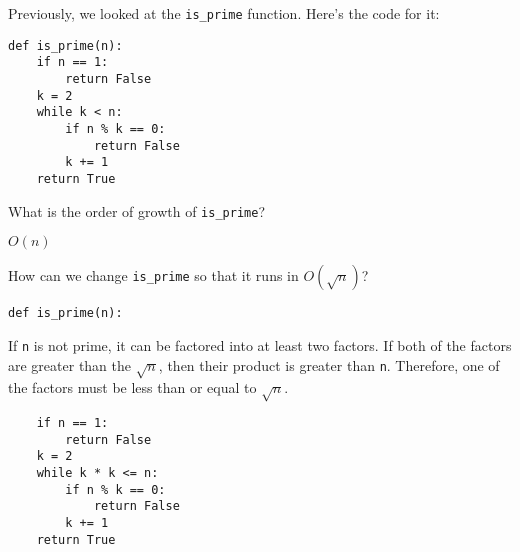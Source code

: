 \question
Previously, we looked at the \texttt{is\_prime} function. Here's the code for it:

\begin{blocksection}
\begin{lstlisting}
def is_prime(n):
    if n == 1:
        return False
    k = 2
    while k < n:
        if n % k == 0: 
            return False
        k += 1 
    return True
\end{lstlisting}
\end{blocksection}

What is the order of growth of \texttt{is\_prime}?

\begin{solution} [0.5in]
    $O(n)$
\end{solution}

How can we change \texttt{is\_prime} so that it runs in $O(\sqrt{n})$?

\begin{lstlisting}
def is_prime(n):
\end{lstlisting}

\begin{solution}[1.0in]
If {\texttt n} is not prime, it can be factored into at least two factors. If both
of the factors are greater than the $\sqrt{n}$, then their product is greater
than \texttt{n}. Therefore, one of the factors must be less than or equal to
$\sqrt{n}$.
\begin{lstlisting}
    if n == 1:
        return False
    k = 2
    while k * k <= n:
        if n % k == 0:
            return False
        k += 1
    return True
\end{lstlisting}
\end{solution}

